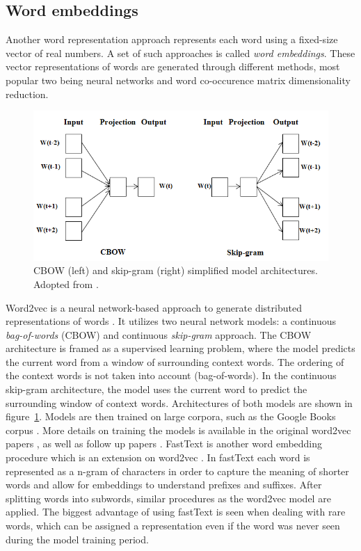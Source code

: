 \subsection{Word embeddings}
\label{sec:embedding}

Another word representation approach represents each word using a fixed-size
vector of real numbers. A set of such approaches is called \textit{word
embeddings}. These vector representations of words are generated through
different methods, most popular two being neural networks and word co-occurence
matrix dimensionality reduction.

\begin{figure}
	\includegraphics[scale=0.65]{skip_gram_cbow.png}
	\caption{CBOW (left) and skip-gram (right) simplified model architectures. Adopted from 
	\citep{suleiman2017deep}. }
	\label{fig:skip_gram_cbow}
\end{figure}

Word2vec is a neural network-based approach to generate distributed
representations of words \citep{mikolov2013distributed}.  It utilizes two
neural network models: a continuous \textit{bag-of-words} (CBOW) and continuous
\textit{skip-gram} approach.  The CBOW architecture is framed as a supervised
learning problem, where the model predicts the current word from a window of
surrounding context words. 
The ordering of the context words is not taken into
account (bag-of-words).  In the continuous skip-gram architecture, the model
uses the current word to predict the surrounding window of context words.
Architectures of both models are shown in figure~\ref{fig:skip_gram_cbow}. 
Models are then trained on large corpora, such as the Google Books corpus 
\citep{lin2012syntactic}. 
More details on training the models is available in the original word2vec papers
\citep{mikolov2013distributed, mikolov2013efficient}, as well as follow up papers
\citep{goldberg2014word2vec, rong2014word2vec}.
FastText is another word embedding procedure which is an extension on word2vec
\citep{bojanowski2017enriching}. In fastText each word is represented as a
n-gram of characters in order to capture the meaning of shorter words and allow
for embeddings to understand prefixes and suffixes. After splitting words into
subwords, similar procedures as the word2vec model are applied. 
The biggest advantage of using fastText is seen when dealing 
with rare words, which can be assigned a representation even if the word was
never seen during the model training period. 

